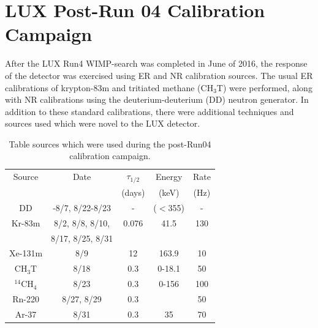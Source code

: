 \chapter{LUX Post-Run 04 Calibration Campaign}
After the LUX Run4 WIMP-search was completed in June of 2016, the response of the detector was exercised using ER and NR calibration sources. The usual ER calibrations of krypton-83m\cite{lux_kr1,lux_kr2} and tritiated methane (CH$_3$T)\cite{lux_tritium} were performed, along with NR calibrations using the deuterium-deuterium (DD) neutron generator\cite{lux_dd1,lux_dd2}. In addition to these standard calibrations, there were additional techniques and sources used which were novel to the LUX detector. 


\begin{table}
\centering
    \begin{tabular}{ c | c | c | c | c }
    \hline
    Source & Date & $\tau_{1/2}$  & Energy & Rate \\ 
     &  & (days) & (keV) & (Hz) \\
    \hline \hline
    DD & -8/7, 8/22-8/23  & - & ($<$355) & - \\ 
    \hline
    Kr-83m & 8/2, 8/8, 8/10,  & 0.076 & 41.5  & 130\\ 
     & 8/17, 8/25, 8/31 & & &\\
    \hline
    Xe-131m & 8/9 & 12 & 163.9 & 10 \\ 
    \hline
    CH$_3$T & 8/18 & 0.3 & 0-18.1 & 50 \\ 
    \hline
    $^{14}$CH$_4$ & 8/23 & 0.3 & 0-156 & 100 \\ 
    \hline
    Rn-220 & 8/27, 8/29 & 0.3 & & 50 \\ 
    \hline
    Ar-37 & 8/31 & 0.3 & 35 & 70 \\ 
    \hline
    \hline
    \end{tabular}
    \caption{Table sources which were used during the post-Run04 calibration campaign.}
\end{table}

